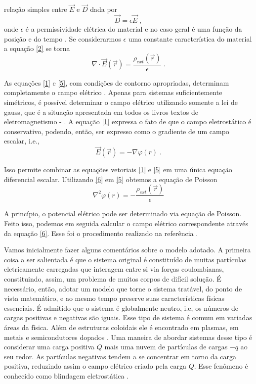 \documentclass[brazilian,10.7pt,a4paper]{article}
\begin{document}
\begin{multicols}{2}
relação simples entre $\vec{E}$ e $\vec{D}$ dada por
\\
\begin{equation}\label{4}
\vec{D} = \epsilon\vec{E}\;,
\end{equation}
onde $\epsilon$ é a permissividade elétrica do material e no caso geral é uma função da posição e do tempo \cite{andrade}. Se considerarmos $\epsilon$ uma constante característica do material a equação \eqref{2} se torna
\\
\begin{equation}\label{5}
\nabla\cdot\vec{E}(\vec{r})=\frac{\rho_{ext}(\vec{r})}{\epsilon}\;.
\end{equation}
\par As equações \eqref{1} e \eqref{5}, com condições de contorno apropriadas, determinam completamente o campo elétrico \cite{tort}. Apenas para sistemas suficientemente simétricos, é possível determinar o campo elétrico utilizando somente a lei de gauss, que é a situação apresentada em todos os livros textos de eletromagnetismo \cite{hm} - \cite{jackson}. A equação \eqref{1} expressa o fato de que o campo eletrostático é conservativo, podendo, então, ser expresso como o gradiente de um campo escalar, i.e., %
\\
\begin{equation}\label{6}
\vec{E}(\vec{r})= -\nabla\varphi(r)\;.
\end{equation}
\par Isso permite combinar as equações vetoriais \eqref{1} e \eqref{5} em uma única equação diferencial escalar. Utilizando \eqref{6} em \eqref{5} obtemos a equação de Poisson
\begin{equation}\label{7}
\nabla^{2}\varphi(r)=-\frac{\rho_{ext}(\vec{r})}{\epsilon}
\end{equation}
\par A princípio, o potencial elétrico pode ser determinado via equação de Poisson. Feito isso, podemos em seguida calcular o campo elétrico correspondente através da equação \eqref{6}. Esse foi o procedimento realizado na referência \cite{ramos}.
\par Vamos inicialmente fazer alguns comentários sobre o modelo adotado. A primeira coisa a ser salientada é que o sistema original é constituído de muitas partículas eletricamente carregadas que interagem entre si via forças coulombianas, constituindo, assim, um problema de muitos corpos de difícil solução. É necessário, então, adotar um modelo que torne o sistema tratável, do ponto de vista matemático, e ao mesmo tempo preserve suas características físicas essenciais. É admitido que o sistema é globalmente neutro, i.e, os números de cargas positivas e negativas são iguais. Esse tipo de sistema é comum em variadas áreas da física. Além de estruturas coloidais ele é encontrado em plasmas, em metais e semicondutores dopados \cite{platzman}. Uma maneira de abordar sistemas desse tipo é considerar uma carga positiva $Q$ mais uma nuvem de partículas de cargas $-q$ ao seu redor. As partículas negativas tendem a se concentrar em torno da carga positiva, reduzindo assim o campo elétrico criado pela carga $Q$. Esse fenômeno é conhecido como blindagem eletrostática \cite{kittel}.

\end{multicols}
\end{document}
